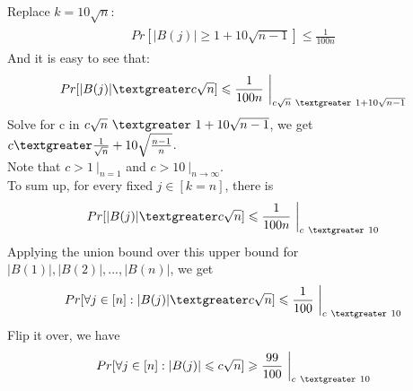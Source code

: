 \documentclass[titlepage, paper=a4, fontsize=11pt]{scrartcl} %
\numberwithin{equation}{section} %
\numberwithin{figure}{section} %
\numberwithin{table}{section} %
\begin{document}
Replace $k = 10\sqrt{n}$:
\begin{align*} 
\begin{split}
Pr[|B(j)| \geqslant 1+10\sqrt{n-1}] \leqslant \frac{1}{100n}
\end{split}					
\end{align*}
And it is easy to see that:
\begin{align*} 
\begin{split}
Pr[|B(j)| \textgreater c\sqrt{n}] \leqslant \frac{1}{100n} \ \bigg|_{c\sqrt{n} \ \textgreater \ 1+10\sqrt{n-1}}
\end{split}					
\end{align*}
Solve for c in $c\sqrt{n} \ \textgreater \ 1+10\sqrt{n-1}$, we get $c \textgreater \frac{1}{\sqrt{n}} + 10\sqrt{\frac{n-1}{n}}$. \\
Note that $c > 1 \ \bigg|_{n=1}$ and $c > 10 \ \bigg|_{n \to \infty}$. \\
To sum up, for every fixed $j \in [k=n]$, there is
\begin{align*} 
\begin{split}
Pr[|B(j)| \textgreater c\sqrt{n}] \leqslant \frac{1}{100n} \ \bigg|_{c \ \textgreater \ 10}
\end{split}					
\end{align*}
Applying the union bound over this upper bound for $|B(1)|, |B(2)|, ..., |B(n)|$, we get
\begin{align*} 
\begin{split}
Pr[\forall j \in [n]: |B(j)| \textgreater c\sqrt{n}] \leqslant \frac{1}{100} \ \bigg|_{c \ \textgreater \ 10}
\end{split}					
\end{align*}
Flip it over, we have
\begin{align*} 
\begin{split}
Pr[\forall j \in [n]: |B(j)| \leqslant c\sqrt{n}] \geqslant \frac{99}{100} \ \bigg|_{c \ \textgreater \ 10}
\end{split}					
\end{align*}
\\


\end{document}
